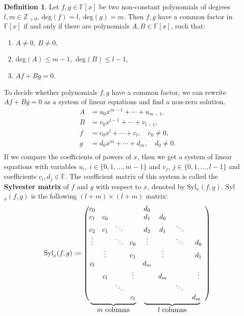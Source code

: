 \documentclass[thesis=M,english]{FITthesis}[2012/10/20]
\theoremstyle{remark}
\theoremstyle{definition}
\newtheorem{DF}{Definition}[section]
\newcommand\coolunder[2]{\mathrlap{\smash{\underbrace{\phantom{%
    \begin{matrix} #2 \end{matrix}}}_{\mbox{$#1$}}}}#2}
\begin{document}
\begin{DF}
Let $f,g \in \mathbb{F}[x]$ be two non-constant polynomials of degrees $l,m \in \mathbb{Z}_{>0}$, deg$(f) = l,\ $deg$(g)=m$. Then $f,g$ have a common factor in $\mathbb{F}[x]$ if and only if there are polynomials $A,B \in \mathbb{F}[x]$, such that:
\begin{enumerate}
\item $A \neq 0,\ B \neq 0,$ 
\item deg$(A) \leq m - 1,$ deg$(B) \leq l - 1,$
\item $Af  + Bg = 0.$
\end{enumerate}
\noindent To decide whether polynomials $f,g$ have a common factor, we can rewrite $Af  + Bg = 0$ as a system of linear equations and find a non-zero solution.
\begin{align*}
A &= u_0x^{m-1} + \cdots + u_{m-1}, \\
B &= v_0x^{l-1} + \cdots + v_{l-1}, \\
f &= c_0x^l + \cdots + c_l, \quad c_0 \neq 0, \\
g &= d_0x^m + \cdots + d_m, \quad d_0 \neq 0. \\
\end{align*}
If we compare the coefficients of powers of $x$, then we get a system of linear equations with variables $u_i,\ i \in \{0,1,\ldots	, m - 1\}$ and $v_j,\ j \in \{0,1,\ldots, l - 1\}$ and coefficients $c_i, d_j \in \mathbb{F}.$ The coefficient matrix of this system is called the \textbf{Sylvester matrix} of $f$ and $g$ with respect to $x$, denoted by Syl$_{x}(f,g)$. Syl$_{x}(f,g)$ is the following $(l + m) \times (l + m)$ matrix:
$$
\text{Syl}_{x}(f,g) := \begin{pmatrix}
c_0 &  &  &  &             d_0 &  &  &  \\
c_1 & c_0 &  &  &        d_1 & d_0 &   &  \\
c_2 & c_1 & \ddots &  & d_2 & d_1 & \ddots  &  \\
\vdots & & \ddots & c_0 & \vdots &  & \ddots & d_0 \\
 &  \vdots &  & c_1 &  & \vdots &  & d_1 \\
c_l &  &  &  &  d_m&  &  & \\
 & c_l &  & \vdots &  & d_m &  & \vdots \\
 &  & \ddots &  &  &  & \ddots &  \\
\coolunder{m \text{ columns}}{\hphantom{..} & \hphantom{...} & \hphantom{..}  & c_l & }\coolunder{l \text{ columns}}{\hphantom{...} & \hphantom{...} & \hphantom{......} & d_m \hphantom{..}} \\

\end{pmatrix}$$
\end{DF}
\end{document}
